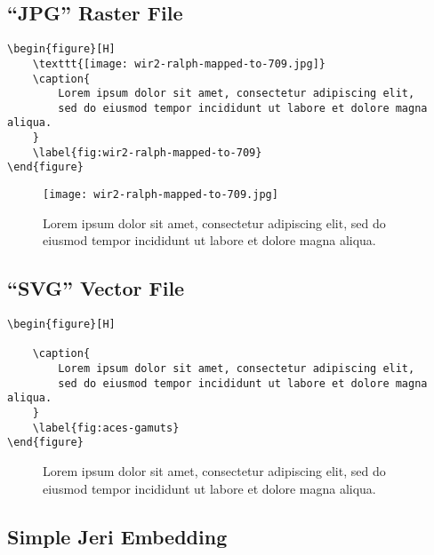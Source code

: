 \subsection*{``JPG'' Raster File}%
\label{subsec:jpg-raster-file}

\begin{lstlisting}[caption={Embedding a ``JPG'' raster file.}]
\begin{figure}[H]
    \texttt{[image: wir2-ralph-mapped-to-709.jpg]}
    \caption{
        Lorem ipsum dolor sit amet, consectetur adipiscing elit,
        sed do eiusmod tempor incididunt ut labore et dolore magna aliqua.
    }
    \label{fig:wir2-ralph-mapped-to-709}
\end{figure}
\end{lstlisting}

\begin{figure}[H]
    \texttt{[image: wir2-ralph-mapped-to-709.jpg]}
    \caption{
        Lorem ipsum dolor sit amet, consectetur adipiscing elit,
        sed do eiusmod tempor incididunt ut labore et dolore magna aliqua.
    }
    \label{fig:wir2-ralph-mapped-to-709}
\end{figure}

\subsection*{``SVG'' Vector File}%
\label{subsec:svg-vector-file}

\begin{lstlisting}[caption={Embedding a ``SVG'' vector file.}]
\begin{figure}[H]
    
    \caption{
        Lorem ipsum dolor sit amet, consectetur adipiscing elit,
        sed do eiusmod tempor incididunt ut labore et dolore magna aliqua.
    }
    \label{fig:aces-gamuts}
\end{figure}
\end{lstlisting}

\begin{figure}[H]
    
    \caption{
        Lorem ipsum dolor sit amet, consectetur adipiscing elit,
        sed do eiusmod tempor incididunt ut labore et dolore magna aliqua.
    }
    \label{fig:aces-gamuts}
\end{figure}

\subsection*{Simple Jeri Embedding}%

